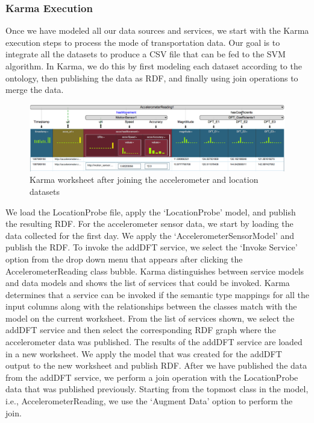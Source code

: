 \subsubsection{Karma Execution} 
Once we have modeled all our data sources and services, we start with the Karma execution steps to process the mode of transportation data. Our goal is to integrate all the datasets to produce a CSV file that can be fed to the SVM algorithm. In Karma, we do this by first modeling each dataset according to the ontology, then publishing the data as RDF, and finally using join operations to merge the data.

\begin{figure}[bp]
\centering
\includegraphics[width=184mm]{img/model_after_augmentation}
\caption{Karma worksheet after joining the accelerometer and location datasets}
\label{fig:model_after_augmentation}
\end{figure}

We load the LocationProbe file, apply the `LocationProbe' model, and publish the resulting RDF. For the accelerometer sensor data, we start by loading the data collected for the first day. We apply the `AccelerometerSensorModel' and publish the RDF. To invoke the addDFT service, we select the `Invoke Service' option from the drop down menu that appears after clicking the AccelerometerReading class bubble. Karma distinguishes between service models and data models and shows the list of services that could be invoked. Karma determines that a service can be invoked if the semantic type mappings for all the input columns along with the relationships between the classes match with the model on the current worksheet. From the list of services shown, we select the addDFT service and then select the corresponding RDF graph where the accelerometer data was published. The results of the addDFT service are loaded in a new worksheet. We apply the model that was created for the addDFT output to the new worksheet and publish RDF. After we have published the data from the addDFT service, we perform a join operation with the LocationProbe data that was published previously. Starting from the topmost class in the model, i.e., AccelerometerReading, we use the `Augment Data' option to perform the join.

